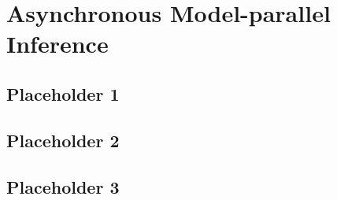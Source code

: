 
\chapter{Asynchronous Model-parallel Inference}

\section{Placeholder 1}

\section{Placeholder 2}

\section{Placeholder 3}

